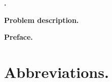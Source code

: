 \documentclass[10pt,a4paper]{article}
\makeatletter
\renewenvironment{abstract}
 {\par\noindent\Huge\textbf{\abstractname.}\\\vspace{1em}\ignorespaces}
 {\par\medskip}
\def \lineheight {1.5pt}
\def\vhrulefill#1{\leavevmode\leaders\hrule\@height#1\hfill \kern\z@}
\makeatother
\begin{document}
	\setcounter{page}{1}
	\pagebreak
	\thispagestyle{nohdr}
	\begin{abstract}
		\large\fontfamily{\rmdefault}\selectfont 
		\noindent\lipsum[1]
	\end{abstract}

	\pagebreak
	\thispagestyle{nohdr}
	\null\pagebreak
	\thispagestyle{nohdr}
	\Huge\textbf{Problem description.}\\
	\vspace{1em}
	\large\fontfamily{\rmdefault}\selectfont 
	\lipsum[1]

	\pagebreak
	\thispagestyle{nohdr}
	\null\pagebreak
	\thispagestyle{nohdr}
	\large\fontfamily{\sfdefault}\selectfont 
	\Huge\textbf{Preface.}\\
	\vspace{1em}
	\large\fontfamily{\rmdefault}\selectfont 
	\lipsum[1]

	\fontfamily{\sfdefault}\selectfont 
	\pagebreak
	\tableofcontents
	\pagebreak
	\listoffigures
	\listoftables


	\fontfamily{\rmdefault}\selectfont 
	\pagebreak
	\null\pagebreak
	\section*{Abbreviations.}
\end{document}
